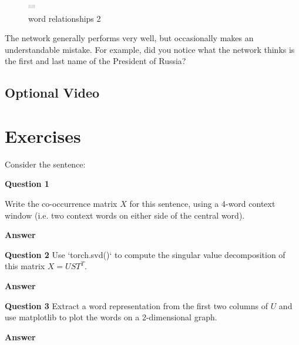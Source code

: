 \documentclass[11pt]{article}
\begin{document}
\begin{figure}[h]
    \centering
    \includegraphics[width=12,height=12]{../out/images/word-relationships-2}
    \caption[word relationships 2]{word relationships 2}
    \label{fig:word relationships 2}
\end{figure}

The network generally performs very well, but occasionally makes an understandable mistake.
For example, did you notice what the network thinks is the first and last name of the President of Russia?

\subsection{Optional Video}\label{subsec:optional-video4}

\section{Exercises}\label{sec:exercises}
Consider the sentence:


\textbf{Question 1}

Write the co-occurrence matrix $X$ for this sentence, using a 4-word context window (i.e. two context words on either side of the central word).

\textbf{Answer}

\textbf{Question 2}
Use `torch.svd()` to compute the singular value decomposition of this matrix $X = UST^T$.

\textbf{Answer}

\textbf{Question 3}
Extract a word representation from the first two columns of $U$ and use matplotlib to plot the words on a 2-dimensional graph.

\textbf{Answer}
\end{document}
